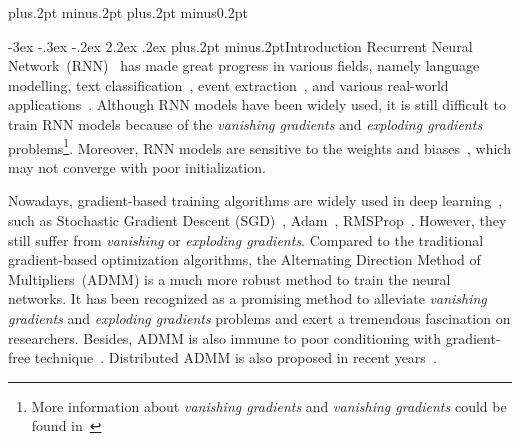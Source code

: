 \documentclass[twoside]{article}
\makeatletter
\def\section{\@startsection{section}{1}{\z@}%
 {-3ex \@plus -.3ex \@minus -.2ex}%
 {2.2ex \@plus.2ex}%
{\normalfont\normalsize\protect\baselineskip=14.5pt plus.2pt minus.2pt\bfseries}}
\makeatother
\begin{document}
\begin{CJK*}{GBK}{song}
\vspace*{3mm}

 

\vspace*{4mm}

\end{CJK*}
\baselineskip=18pt plus.2pt minus.2pt
\parskip=0pt plus.2pt minus0.2pt
\begin{multicols}{2}

\section{Introduction}\label{sec:introduction}
Recurrent Neural Network~(RNN)~\cite{elman1990finding} has made great progress in various fields, namely language modelling, text classification~\cite{Lai2015TC}, event extraction~\cite{Nguyen2016JRNN}, and various real-world applications~\cite{graves2007multi,mikolov2010recurrent}.
Although RNN models have been widely used, %
it is still difficult to train RNN models because of the \textit{vanishing gradients} and \textit{exploding gradients} problems\footnote{More information about \textit{vanishing gradients} and \textit{vanishing gradients} could be found in~\cite{bengio1994learning}}.
Moreover, RNN models are sensitive to the weights and biases~\cite{sutskever2013importance}, which may not converge with poor initialization.

Nowadays, gradient-based training algorithms are widely used in deep learning~\cite{lecun2015deep}, 
such as Stochastic Gradient Descent (SGD)~\cite{robbins1951stochastic}, Adam~\cite{Kingma2014Adam}, RMSProp~\cite{tieleman2012lecture}. %
However, %
they still suffer from \textit{vanishing} or \textit{exploding gradients}.
Compared to the traditional gradient-based optimization algorithms, the Alternating Direction Method of Multipliers~(ADMM) is a much more robust method to train the neural networks.
It has been recognized as a promising method to alleviate \textit{vanishing gradients} and \textit{exploding gradients} problems and exert a tremendous fascination on researchers. Besides, ADMM is also immune to poor conditioning with gradient-free technique~\cite{taylor2016training}. Distributed ADMM is also proposed in recent years~\cite{boyd2011distributed,wei2013}.


\end{multicols}
\end{document}
